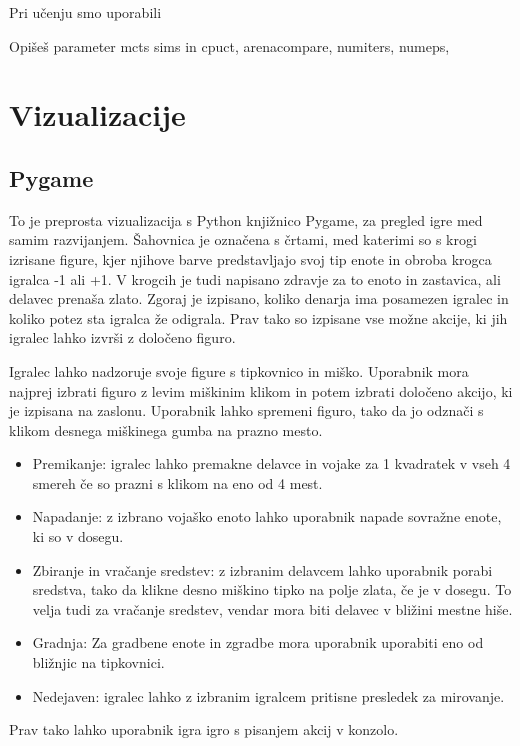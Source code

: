 \documentclass[a4paper, 12pt]{book}
\begin{document}
Pri učenju smo uporabili 

Opišeš parameter mcts sims in cpuct, arenacompare, numiters, numeps, 






\chapter{Vizualizacije}
\label{chvizualizacija}

\section{Pygame}
To je preprosta vizualizacija s Python knjižnico Pygame, za pregled igre med samim razvijanjem. Šahovnica je označena s črtami, med katerimi so s krogi izrisane figure, kjer njihove barve predstavljajo svoj tip enote in obroba krogca igralca -1 ali +1.
V krogcih je tudi napisano zdravje za to enoto in zastavica, ali delavec prenaša zlato.
Zgoraj je izpisano, koliko denarja ima posamezen igralec in koliko potez sta igralca že odigrala. Prav tako so izpisane vse možne akcije, ki jih igralec lahko izvrši z določeno figuro.

Igralec lahko nadzoruje svoje figure s tipkovnico in miško.
Uporabnik mora najprej izbrati figuro z levim miškinim klikom in potem izbrati določeno akcijo, ki je izpisana na zaslonu. Uporabnik lahko spremeni figuro, tako da jo odznači s klikom desnega miškinega gumba na prazno mesto.

\begin{itemize}
	\item Premikanje: igralec lahko premakne delavce in vojake za 1 kvadratek v vseh 4 smereh če so prazni s klikom na eno od 4 mest.
	\item Napadanje: z izbrano vojaško enoto lahko uporabnik napade sovražne enote, ki so v dosegu.
	\item Zbiranje in vračanje sredstev: z izbranim delavcem lahko uporabnik porabi sredstva, tako da klikne desno miškino tipko na polje zlata, če je v dosegu. To velja tudi za vračanje sredstev, vendar mora biti delavec v bližini mestne hiše.
	\item Gradnja: Za gradbene enote in zgradbe mora uporabnik uporabiti eno od bližnjic na tipkovnici.
	\item Nedejaven: igralec lahko z izbranim igralcem pritisne presledek za mirovanje.
\end{itemize}

Prav tako lahko uporabnik igra igro s pisanjem akcij v konzolo.
\end{document}

